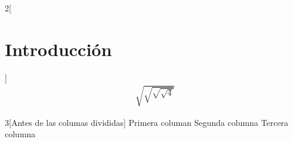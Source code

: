 \documentclass{article}
\begin{document}
\begin{paracol}{2}[\section{Introducción}]
\lipsum[1]
\switchcolumn
\begin{align*}
\sqrt{\sqrt{\sqrt{\sqrt{4}}}}
\end{align*}
\end{paracol}
\begin{paracol}{3}[Antes de las columas divididas]
Primera columan
\switchcolumn
Segunda columna
\switchcolumn
Tercera columna
\end{paracol}
\end{document}
